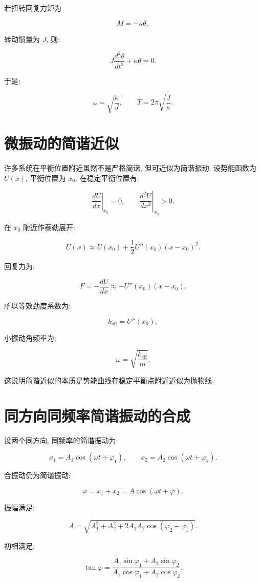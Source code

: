 \documentclass[
  a4paper,
]{ctexrep}
\begin{document}
若扭转回复力矩为

\[
M=-\kappa\theta,
\]

转动惯量为 \(J\), 则:

\[
J\frac{d^2\theta}{dt^2}+\kappa\theta=0.
\]

于是:

\[
\omega=\sqrt{\frac{\kappa}{J}},\qquad T=2\pi\sqrt{\frac{J}{\kappa}}.
\]

\section{微振动的简谐近似}\label{ux5faeux632fux52a8ux7684ux7b80ux8c10ux8fd1ux4f3c}

许多系统在平衡位置附近虽然不是严格简谐, 但可近似为简谐振动. 设势能函数为
\(U(x)\), 平衡位置为 \(x_0\). 在稳定平衡位置有:

\[
\left.\frac{dU}{dx}\right|_{x_0}=0,
\qquad
\left.\frac{d^2U}{dx^2}\right|_{x_0}>0.
\]

在 \(x_0\) 附近作泰勒展开:

\[
U(x)\approx U(x_0)+\frac{1}{2}U''(x_0)(x-x_0)^2.
\]

回复力为:

\[
F=-\frac{dU}{dx}\approx -U''(x_0)(x-x_0).
\]

所以等效劲度系数为:

\[
k_{\mathrm{eff}}=U''(x_0),
\]

小振动角频率为:

\[
\omega=\sqrt{\frac{k_{\mathrm{eff}}}{m}}.
\]

这说明简谐近似的本质是势能曲线在稳定平衡点附近近似为抛物线.

\section{同方向同频率简谐振动的合成}\label{ux540cux65b9ux5411ux540cux9891ux7387ux7b80ux8c10ux632fux52a8ux7684ux5408ux6210}

设两个同方向, 同频率的简谐振动为:

\[
x_1=A_1\cos(\omega t+\varphi_1),\qquad
x_2=A_2\cos(\omega t+\varphi_2).
\]

合振动仍为简谐振动:

\[
x=x_1+x_2=A\cos(\omega t+\varphi).
\]

振幅满足:

\[
A=\sqrt{A_1^2+A_2^2+2A_1A_2\cos(\varphi_2-\varphi_1)}.
\]

初相满足:

\[
\tan\varphi=\frac{A_1\sin\varphi_1+A_2\sin\varphi_2}{A_1\cos\varphi_1+A_2\cos\varphi_2}.
\]
\end{document}
